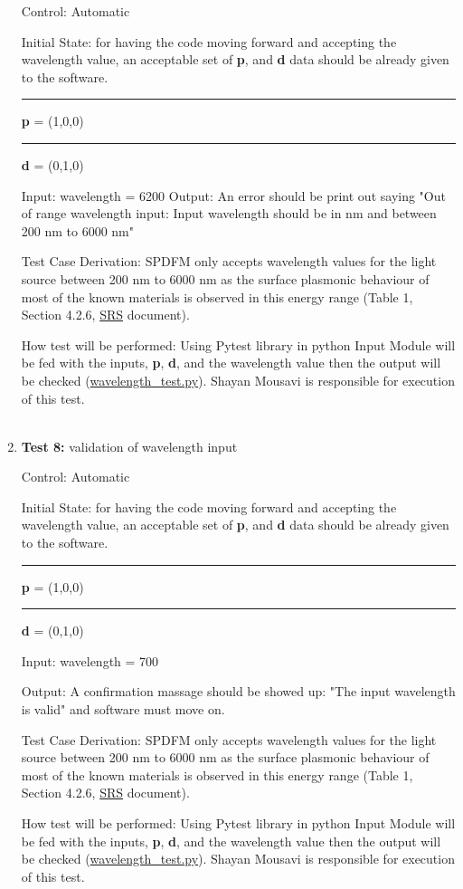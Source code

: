 \documentclass[12pt, titlepage]{article}
\begin{document}
\begin{enumerate}
Control: Automatic

Initial State: for having the code moving forward and accepting the wavelength value, an acceptable set of \textbf{p}, and \textbf{d} data should be already given to the software.\\ 
\rule{2.3cm}{0pt} \textbf{p} = (1,0,0)\\
\rule{2.3cm}{0pt} \textbf{d} = (0,1,0)

Input: wavelength = 6200
Output: An error should be print out saying "Out of range wavelength input: Input wavelength should be in nm and between 200 nm to 6000 nm" 

Test Case Derivation: SPDFM only accepts wavelength values for the light source between 200 nm to 6000 nm as the surface plasmonic behaviour of most of the known materials is observed in this energy range (Table 1, Section 4.2.6, \href{https://github.com/shmouses/SPDFM/tree/master/doc/SRS}{SRS} document). 

How test will be performed: Using Pytest library in python Input Module will be fed with the inputs, \textbf{p}, \textbf{d}, and the wavelength value then the output will be checked (\href{https://github.com/shmouses/SPDFM/tree/master/src}{wavelength\_test.py}). Shayan Mousavi is responsible for execution of this test.
\\
\\
\item{\textbf{Test 8:} validation of wavelength input\\}

Control: Automatic

Initial State: for having the code moving forward and accepting the wavelength value, an acceptable set of \textbf{p}, and \textbf{d} data should be already given to the software.\\ 
\rule{2.3cm}{0pt} \textbf{p} = (1,0,0)\\
\rule{2.3cm}{0pt} \textbf{d} = (0,1,0)

Input: wavelength = 700

Output: A confirmation massage should be showed up: "The input wavelength is valid" and software must move on.

Test Case Derivation: SPDFM only accepts wavelength values for the light source between 200 nm to 6000 nm as the surface plasmonic behaviour of most of the known materials is observed in this energy range (Table 1, Section 4.2.6, \href{https://github.com/shmouses/SPDFM/tree/master/doc/SRS}{SRS} document). 

How test will be performed: Using Pytest library in python Input Module will be fed with the inputs, \textbf{p}, \textbf{d}, and the wavelength value then the output will be checked (\href{https://github.com/shmouses/SPDFM/tree/master/src}{wavelength\_test.py}). Shayan Mousavi is responsible for execution of this test. 
\\
\\
\end{enumerate}
\end{document}
